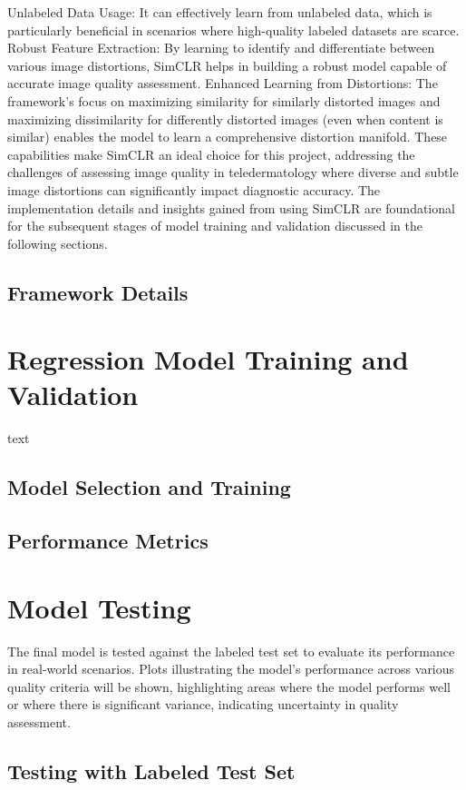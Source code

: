 Unlabeled Data Usage: It can effectively learn from unlabeled data, which is particularly beneficial in scenarios where high-quality labeled datasets are scarce.
Robust Feature Extraction: By learning to identify and differentiate between various image distortions, SimCLR helps in building a robust model capable of accurate image quality assessment.
Enhanced Learning from Distortions: The framework’s focus on maximizing similarity for similarly distorted images and maximizing dissimilarity for differently distorted images (even when content is similar) enables the model to learn a comprehensive distortion manifold.
These capabilities make SimCLR an ideal choice for this project, addressing the challenges of assessing image quality in teledermatology where diverse and subtle image distortions can significantly impact diagnostic accuracy. The implementation details and insights gained from using SimCLR are foundational for the subsequent stages of model training and validation discussed in the following sections. \par
\vspace{\baselineskip}
\noindent

\subsection{Framework Details}
\label{sub:FrameworkDetails}


\section{Regression Model Training and Validation}
\label{sec:ModelTrainVal}
text \par
\vspace{\baselineskip}
\noindent

\subsection{Model Selection and Training}
\label{sub:ModelTraining}

\subsection{Performance Metrics}
\label{sub:PerfMetrics}


\section{Model Testing}
\label{sec:ModelTesting}
The final model is tested against the labeled test set to evaluate its performance in real-world scenarios. Plots illustrating the model’s performance across various quality criteria will be shown, highlighting areas where the model performs well or where there is significant variance, indicating uncertainty in quality assessment. \par
\vspace{\baselineskip}
\noindent

\subsection{Testing with Labeled Test Set}
\label{sub:TestLabeledSet}